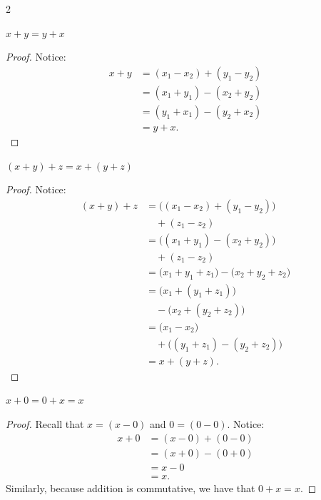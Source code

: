 \begin{multicols}{2}
\begin{proposition}
	$x + y = y + x$
\end{proposition}
\begin{proof}
	Notice:
	\begin{align*}
		x + y &= (x_1 \minus x_2) + (y_1 \minus y_2) \\
		&= (x_1 + y_1) \minus (x_2 + y_2) \\
		&= (y_1 + x_1) \minus (y_2  + x_2) \\\
		&= y + x.
	\end{align*}
\end{proof}
\begin{proposition}
	$(x+y)+z =x+(y+z)$
\end{proposition}
\begin{proof}
	Notice:
	\begin{align*}
		(x+y) + z &= \big( (x_1 \minus x_2) + (y_1 \minus y_2) \big) \\
		&\quad + (z_1 \minus z_2) \\\
		&= \big((x_1 + y_1) \minus (x_2 + y_2) \big) \\
		&\quad + (z_1 \minus z_2)\\
		&= \big(x_1 + y_1 + z_1\big) \minus \big(x_2 + y_2 + z_2\big) \\
		&= \big(x_1 + (y_1 + z_1)\big) \\
		&\quad \minus \big(x_2 + (y_2 + z_2)\big) \\
		&= \big(x_1 \minus x_2) \\
		&\quad + \big((y_1 + z_1) \minus (y_2 + z_2)) \\
		&= x + (y+z).
	\end{align*}
\end{proof}
\begin{proposition}
	$x+0 = 0+x = x$
\end{proposition}
\begin{proof}
	Recall that $x = (x \minus 0)$ and $0 = (0 \minus 0)$. 
	Notice:
	\begin{align*}
		x + 0 &= (x \minus 0) + (0 \minus 0) \\
		&= (x + 0) \minus (0 + 0) \\
		&= x \minus 0 \\
		&= x.
	\end{align*}
	Similarly, because addition is commutative, we have that $0 + x = x.$
\end{proof}


\end{multicols}
